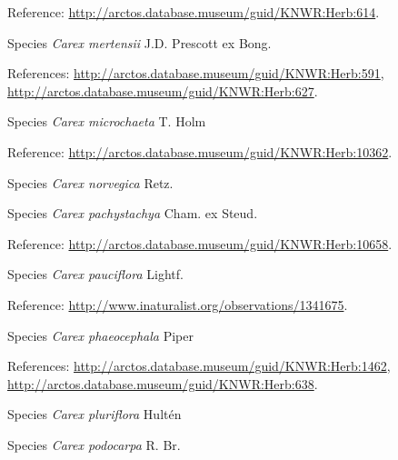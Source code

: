 \documentclass[9pt, article]{memoir}
\begin{document}
\begin{multicols}{2}
\vspace{6pt}Reference: 
\url{http://arctos.database.museum/guid/KNWR:Herb:614}.

\vspace{6pt}\noindent\hspace{36pt}Species \textit{Carex mertensii} J.D. Prescott ex Bong.


\vspace{6pt}References: 
\url{http://arctos.database.museum/guid/KNWR:Herb:591}, 
\url{http://arctos.database.museum/guid/KNWR:Herb:627}.

\vspace{6pt}\noindent\hspace{36pt}Species \textit{Carex microchaeta} T. Holm


\vspace{6pt}Reference: 
\url{http://arctos.database.museum/guid/KNWR:Herb:10362}.

\vspace{6pt}\noindent\hspace{36pt}Species \textit{Carex norvegica} Retz.


\vspace{6pt}\noindent\hspace{36pt}Species \textit{Carex pachystachya} Cham. ex Steud.


\vspace{6pt}Reference: 
\url{http://arctos.database.museum/guid/KNWR:Herb:10658}.

\vspace{6pt}\noindent\hspace{36pt}Species \textit{Carex pauciflora} Lightf.


\vspace{6pt}Reference: 
\url{http://www.inaturalist.org/observations/1341675}.

\vspace{6pt}\noindent\hspace{36pt}Species \textit{Carex phaeocephala} Piper


\vspace{6pt}References: 
\url{http://arctos.database.museum/guid/KNWR:Herb:1462}, 
\url{http://arctos.database.museum/guid/KNWR:Herb:638}.

\vspace{6pt}\noindent\hspace{36pt}Species \textit{Carex pluriflora} Hultén


\vspace{6pt}\noindent\hspace{36pt}Species \textit{Carex podocarpa} R. Br.



\end{multicols}
\end{document}
